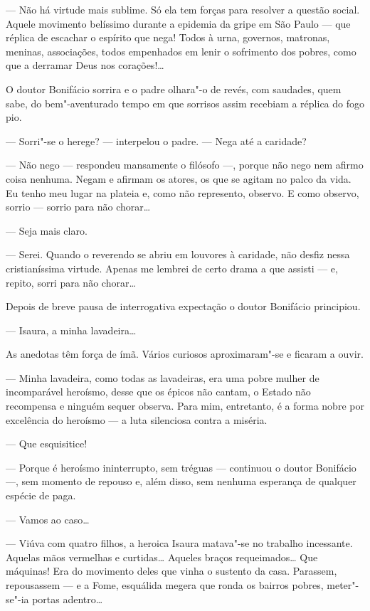 --- Não há virtude mais sublime. Só ela tem forças para resolver a
questão social. Aquele movimento belíssimo durante a epidemia da gripe
em São Paulo --- que réplica de escachar o espírito que nega! Todos à
urna, governos, matronas, meninas, associações, todos empenhados em
lenir o sofrimento dos pobres, como que a derramar Deus nos corações!\ldots{}

O doutor Bonifácio sorrira e o padre olhara"-o de revés, com saudades,
quem sabe, do bem"-aventurado tempo em que sorrisos assim recebiam a
réplica do fogo pio.

--- Sorri"-se o herege? --- interpelou o padre. --- Nega até a caridade?

--- Não nego --- respondeu mansamente o filósofo ---, porque não nego
nem afirmo coisa nenhuma. Negam e afirmam os atores, os que se agitam no
palco da vida. Eu tenho meu lugar na plateia e, como não represento,
observo. E como observo, sorrio --- sorrio para não chorar\ldots{}

--- Seja mais claro.

--- Serei. Quando o reverendo se abriu em louvores à caridade, não
desfiz nessa cristianíssima virtude. Apenas me lembrei de certo drama a
que assisti --- e, repito, sorri para não chorar\ldots{}

Depois de breve pausa de interrogativa expectação o doutor Bonifácio
principiou.

--- Isaura, a minha lavadeira\ldots{}

As anedotas têm força de ímã. Vários curiosos aproximaram"-se e ficaram a
ouvir.

--- Minha lavadeira, como todas as lavadeiras, era uma pobre mulher de
incomparável heroísmo, desse que os épicos não cantam, o Estado não
recompensa e ninguém sequer observa. Para mim, entretanto, é a forma
nobre por excelência do heroísmo --- a luta silenciosa contra a miséria.

--- Que esquisitice!

--- Porque é heroísmo ininterrupto, sem tréguas --- continuou o doutor
Bonifácio ---, sem momento de repouso e, além disso, sem nenhuma
esperança de qualquer espécie de paga.

--- Vamos ao caso\ldots{}

--- Viúva com quatro filhos, a heroica Isaura matava"-se no trabalho
incessante. Aquelas mãos vermelhas e curtidas\ldots{} Aqueles braços
requeimados\ldots{} Que máquinas! Era do movimento deles que vinha o sustento
da casa. Parassem, repousassem --- e a Fome, esquálida megera que ronda
os bairros pobres, meter"-se"-ia portas adentro\ldots{}

